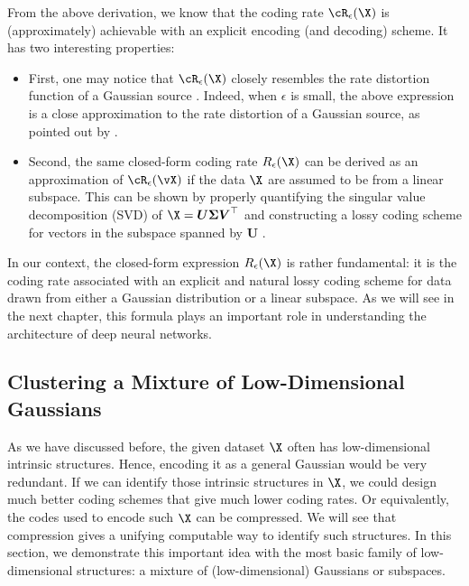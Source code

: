 \documentclass[../../book-main.tex]{subfiles}
\begin{document}
From the above derivation, we know that the coding rate $\cR_{\epsilon}(\X)$ is (approximately) achievable with an explicit encoding (and decoding) scheme. It has two interesting  properties:
\begin{itemize}
	\item First, one may notice that $\cR_{\epsilon}(\X)$ closely resembles the rate distortion function of a Gaussian source \cite{Cover-Thomas}. Indeed, when $\epsilon$ is small, the above expression is a close approximation to the rate distortion of a Gaussian source, as pointed out by   \cite{MaY2007-PAMI}.
	\item Second, the same closed-form coding rate $R_{\epsilon}(\X)$ can be derived as an approximation of \(\cR_{\epsilon}(\vX)\) if the data $\X$ are assumed to be from a linear subspace. This can be shown by properly quantifying the singular value decomposition (SVD) of $\X = \boldsymbol{U} \boldsymbol{\Sigma}\boldsymbol{V}^\top$ and constructing a lossy coding scheme for vectors in the subspace spanned by $\boldsymbol{U}$ \cite{MaY2007-PAMI}.
\end{itemize}
In our context, the closed-form expression $R_{\epsilon}(\X)$ is rather fundamental: it is the coding rate associated with an explicit and natural lossy coding scheme for data drawn from either a Gaussian distribution or a linear subspace. As we will see in the next chapter, this formula plays an important role in understanding the architecture of deep neural networks.


\subsection{Clustering a Mixture of Low-Dimensional Gaussians}
\label{sec:clustering-Gaussians}
As we have discussed before, the given dataset $\X$ often has low-dimensional intrinsic structures. Hence, encoding it as a general Gaussian would be very redundant. If we can identify those intrinsic structures in $\X$, we could design much better coding schemes that give much lower coding rates. Or equivalently, the codes used to encode such $\X$ can be compressed. We will see that compression gives a unifying computable way to identify such structures. In this section, we demonstrate this important idea with the most basic family of low-dimensional structures: a mixture of (low-dimensional) Gaussians or subspaces.
\end{document}
